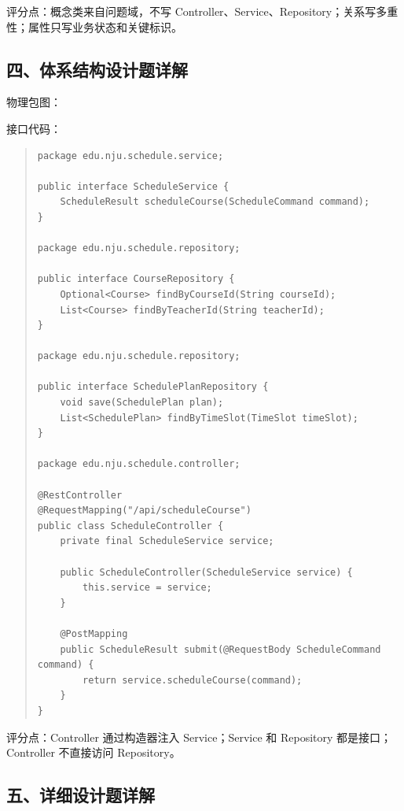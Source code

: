 \documentclass[UTF8,zihao=-4]{ctexart}
\begin{document}
评分点：概念类来自问题域，不写 Controller、Service、Repository；关系写多重性；属性只写业务状态和关键标识。


\subsection{四、体系结构设计题详解}


物理包图：





接口代码：


\begin{quote}
\footnotesize
\begin{verbatim}
package edu.nju.schedule.service;

public interface ScheduleService {
    ScheduleResult scheduleCourse(ScheduleCommand command);
}

package edu.nju.schedule.repository;

public interface CourseRepository {
    Optional<Course> findByCourseId(String courseId);
    List<Course> findByTeacherId(String teacherId);
}

package edu.nju.schedule.repository;

public interface SchedulePlanRepository {
    void save(SchedulePlan plan);
    List<SchedulePlan> findByTimeSlot(TimeSlot timeSlot);
}

package edu.nju.schedule.controller;

@RestController
@RequestMapping("/api/scheduleCourse")
public class ScheduleController {
    private final ScheduleService service;

    public ScheduleController(ScheduleService service) {
        this.service = service;
    }

    @PostMapping
    public ScheduleResult submit(@RequestBody ScheduleCommand command) {
        return service.scheduleCourse(command);
    }
}
\end{verbatim}
\end{quote}



评分点：Controller 通过构造器注入 Service；Service 和 Repository 都是接口；Controller 不直接访问 Repository。


\subsection{五、详细设计题详解}
\end{document}
